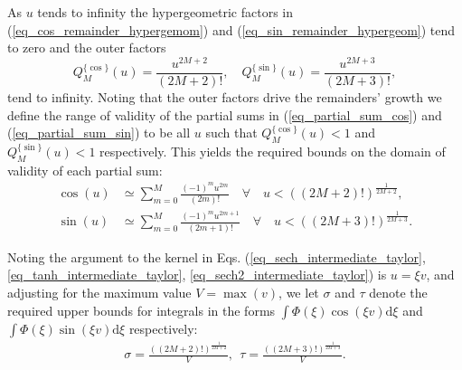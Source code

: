 As $u$ tends to infinity the hypergeometric factors in
(\ref{eq_cos_remainder_hypergemom}) and (\ref{eq_sin_remainder_hypergeom})
tend to zero and the outer factors
\begin{equation}
	Q_M^{\{\cos\}}(u) = \frac{u^{2M+2}}{(2M+2)!}, 
	\quad Q_M^{\{\sin\}}(u) = \frac{u^{2M+3}}{(2M+3)!},
\end{equation}
tend to infinity. Noting that the outer factors drive the remainders'
growth we define the range of validity of the partial sums
in (\ref{eq_partial_sum_cos}) and (\ref{eq_partial_sum_sin})
to be all $u$ such that
$Q_M^{\{\cos\}}(u) < 1$ and $Q_M^{\{\sin\}}(u) < 1$
respectively.  This yields the required bounds on the
domain of validity of each partial sum:
\begin{align}
	\cos(u) &\simeq \sum_{m=0}^M \frac{(-1)^m u^{2m}}{(2m)!}
	\quad \forall \quad u < ((2M+2)!)^{\frac{1}{2M+2}}, \\
	\sin(u) &\simeq \sum_{m=0}^M \frac{(-1)^m u^{2m+1}}{(2m+1)!}  
	\quad \forall \quad u < ((2M+3)!)^{\frac{1}{2M+3}}.
\end{align}

Noting the argument to the kernel in Eqs. (\ref{eq_sech_intermediate_taylor}, \ref{eq_tanh_intermediate_taylor}, \ref{eq_sech2_intermediate_taylor})
is $u = \xi v$, and adjusting for the maximum value $V = \max(v)$, we
let $\sigma$ and $\tau$ denote the required upper bounds for
integrals in the forms $\int \Phi(\xi)\cos(\xi v)\mathrm{d}\xi$ and
$\int \Phi(\xi)\sin(\xi v)\mathrm{d}\xi$
respectively:
\begin{align}
	\sigma = \frac{((2M+2)!)^{\frac{1}{2M+2}}}{V}, \ \ 
	\tau = \frac{((2M+3)!)^{\frac{1}{2M+3}}}{V}.
	\label{eq_range_of_validity}
\end{align}

